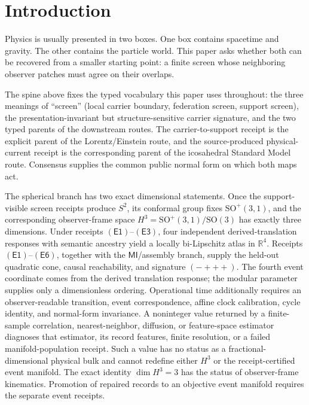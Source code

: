\documentclass[11pt]{article}
\begin{document}


\section{Introduction}

Physics is usually presented in two boxes. One box contains spacetime and gravity. The other contains the particle world. This paper asks whether both can be recovered from a smaller starting point: a finite screen whose neighboring observer patches must agree on their overlaps.

The spine above fixes the typed vocabulary this paper uses throughout: the
three meanings of ``screen'' (local carrier boundary, federation screen,
support screen), the presentation-invariant but structure-sensitive carrier
signature, and the two typed parents of the downstream routes. The
carrier-to-support receipt is the explicit parent of the Lorentz/Einstein
route, and the source-produced physical-current receipt is the corresponding
parent of the icosahedral Standard Model route. Consensus supplies the common
public normal form on which both maps act.

The spherical branch has two exact dimensional statements. Once the
support-visible screen receipts produce \(S^2\), its conformal group fixes
\(\mathrm{SO}^{+}(3,1)\), and the corresponding observer-frame space
\(H^3=\mathrm{SO}^{+}(3,1)/\mathrm{SO}(3)\) has exactly three dimensions.
Under receipts \(\mathsf{(E1)}\)--\(\mathsf{(E3)}\), four independent
derived-translation responses with semantic ancestry yield a locally
bi-Lipschitz atlas in \(\mathbb R^4\). Receipts \(\mathsf{(E1)}\)--\(\mathsf{(E6)}\),
together with the \(\mathsf{MI}\)/assembly branch, supply the held-out
quadratic cone, causal reachability, and signature \((-{+}{+}{+})\). The fourth
event coordinate comes from the derived translation response; the modular
parameter supplies only a dimensionless ordering. Operational time additionally
requires an observer-readable transition, event correspondence, affine clock
calibration, cycle identity, and normal-form invariance. A noninteger value
returned by a finite-sample correlation, nearest-neighbor, diffusion, or
feature-space estimator diagnoses that estimator, its record features, finite
resolution, or a failed manifold-population receipt. Such a value has no status
as a fractional-dimensional physical bulk and cannot redefine either \(H^3\) or
the receipt-certified event manifold. The exact identity \(\dim H^3=3\) has the
status of observer-frame kinematics. Promotion of repaired records to an
objective event manifold requires the separate event receipts.
\end{document}
